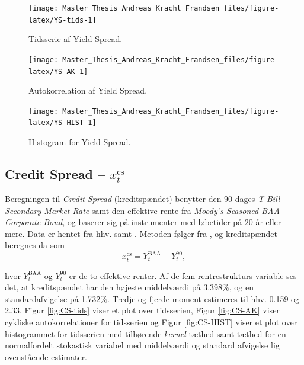 \documentclass[
  a4paper,
  oneside]{memoir}
\begin{document}
\begin{figure}[H]

{\centering \texttt{[image: Master\_Thesis\_Andreas\_Kracht\_Frandsen\_files/figure-latex/YS-tids-1]} 

}

\caption{Tidsserie af Yield Spread.}\label{fig:YS-tids}
\end{figure}

\begin{figure}[H]

{\centering \texttt{[image: Master\_Thesis\_Andreas\_Kracht\_Frandsen\_files/figure-latex/YS-AK-1]} 

}

\caption{Autokorrelation af Yield Spread.}\label{fig:YS-AK}
\end{figure}

\begin{figure}[H]

{\centering \texttt{[image: Master\_Thesis\_Andreas\_Kracht\_Frandsen\_files/figure-latex/YS-HIST-1]} 

}

\caption{Histogram for Yield Spread.}\label{fig:YS-HIST}
\end{figure}

\hypertarget{credit-spread-x_ttextcs}{%
\subsection{\texorpdfstring{Credit Spread -- \(x_t^{\text{cs}}\)}{Credit Spread -- x\_t\^{}\{\textbackslash text\{cs\}\}}}\label{credit-spread-x_ttextcs}}

Beregningen til \emph{Credit Spread} (kreditspændet) benytter den 90-dages \emph{T-Bill} \emph{Secondary Market Rate} samt den effektive rente fra \emph{Moody's Seasoned BAA Corporate Bond}, og baserer sig på instrumenter med løbetider på \(20\) år eller mere. Data er hentet fra hhv. \citep{FRED902020} samt \citep{Goyal2007}. Metoden følger fra \citep{Keim1986}, og kreditspændet beregnes da som
\[x_t^{\text{cs}}=Y_t^{\text{BAA}}-Y_t^{90},\]

hvor \(Y_t^{\text{BAA}}\) og \(Y_t^{90}\) er de to effektive renter. Af de fem rentrestrukturs variable ses det, at kreditspændet har den højeste middelværdi på 3.398\(\%\), og en standardafvigelse på 1.732\(\%\). Tredje og fjerde moment estimeres til hhv. 0.159 og 2.33. Figur \ref{fig:CS-tids} viser et plot over tidsserien, Figur \ref{fig:CS-AK} viser cykliske autokorrelationer for tidsserien og Figur \ref{fig:CS-HIST} viser et plot over histogrammet for tidsserien med tilhørende \emph{kernel} tæthed samt tæthed for en normalfordelt stokastisk variabel med middelværdi og standard afvigelse lig ovenstående estimater.
\end{document}

